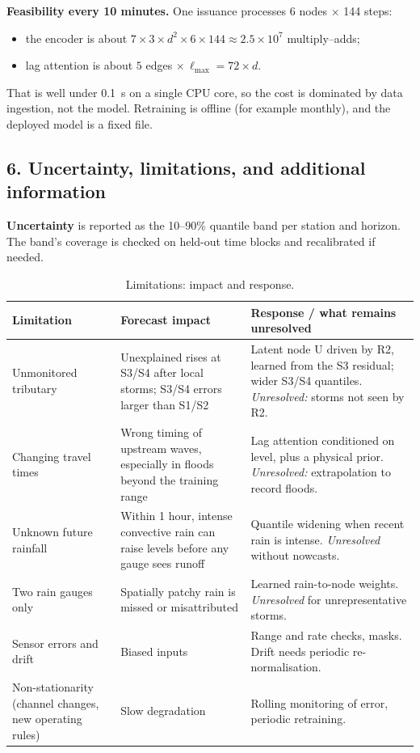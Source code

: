 \documentclass[11pt]{article}
\begin{document}
\noindent\textbf{Feasibility every 10 minutes.} One issuance processes $6$ nodes $\times$ 144 steps:
\begin{itemize}
  \item the encoder is about $7\times3\times d^2\times6\times144\approx 2.5\times10^7$ multiply--adds;
  \item lag attention is about $5$ edges $\times\,\ell_{\max}{=}72\times d$.
\end{itemize}
That is well under 0.1~s on a single CPU core, so the cost is dominated by data ingestion, not the model. Retraining is offline (for example monthly), and the deployed model is a fixed file.

\subsection*{6. Uncertainty, limitations, and additional information}

\textbf{Uncertainty} is reported as the 10--90\% quantile band per station and horizon. The band's coverage is checked on held-out time blocks and recalibrated if needed.

\begin{table}[H]
\centering\small
\caption{Limitations: impact and response.}
\begin{tabularx}{\linewidth}{@{}p{3.2cm} Y Y@{}}
\toprule
Limitation & Forecast impact & Response / what remains unresolved\\
\midrule
Unmonitored tributary & Unexplained rises at S3/S4 after local storms; S3/S4 errors larger than S1/S2 & Latent node U driven by R2, learned from the S3 residual; wider S3/S4 quantiles. \emph{Unresolved:} storms not seen by R2.\\
Changing travel times & Wrong timing of upstream waves, especially in floods beyond the training range & Lag attention conditioned on level, plus a physical prior. \emph{Unresolved:} extrapolation to record floods.\\
Unknown future rainfall & Within 1 hour, intense convective rain can raise levels before any gauge sees runoff & Quantile widening when recent rain is intense. \emph{Unresolved} without nowcasts.\\
Two rain gauges only & Spatially patchy rain is missed or misattributed & Learned rain-to-node weights. \emph{Unresolved} for unrepresentative storms.\\
Sensor errors and drift & Biased inputs & Range and rate checks, masks. Drift needs periodic re-normalisation.\\
Non-stationarity (channel changes, new operating rules) & Slow degradation & Rolling monitoring of error, periodic retraining.\\
\bottomrule
\end{tabularx}
\end{table}
\end{document}
